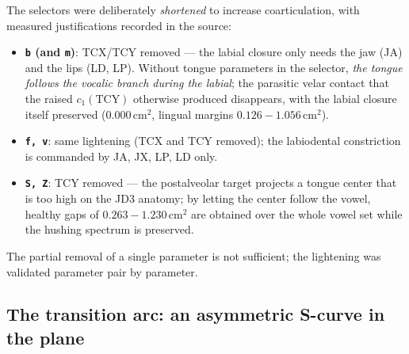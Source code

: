 \documentclass[11pt,a4paper]{article}
\begin{document}
The selectors were deliberately \emph{shortened} to increase
coarticulation, with measured justifications recorded in the source:

\begin{itemize}[leftmargin=1.5em]
\item \textbf{\texttt{b} (and \texttt{m})}: TCX/TCY removed --- the labial
      closure only needs the jaw (JA) and the lips (LD, LP). Without
      tongue parameters in the selector, \emph{the tongue follows the
      vocalic branch during the labial}; the parasitic velar contact that
      the raised \(c_1(\mathrm{TCY})\) otherwise produced disappears, with
      the labial closure itself preserved
      (\(0.000\,\mathrm{cm^2}\), lingual margins
      \(0.126\!-\!1.056\,\mathrm{cm^2}\)).
\item \textbf{\texttt{f, v}}: same lightening (TCX and TCY removed);
      the labiodental constriction is commanded by JA, JX, LP, LD only.
\item \textbf{\texttt{S, Z}}: TCY removed --- the postalveolar target
      projects a tongue center that is too high on the JD3 anatomy; by
      letting the center follow the vowel, healthy gaps of
      \(0.263\!-\!1.230\,\mathrm{cm^2}\) are obtained over the whole vowel
      set while the hushing spectrum is preserved.
\end{itemize}

The partial removal of a single parameter is not sufficient; the
lightening was validated parameter pair by parameter.

\subsection{The transition arc: an asymmetric S-curve in the plane}\label{subsec:arc}
\end{document}
